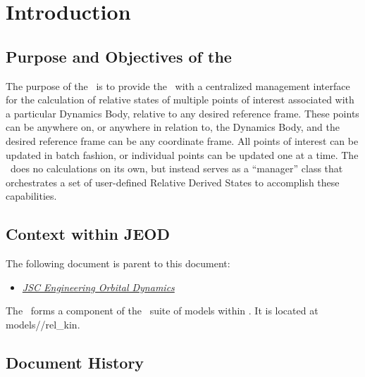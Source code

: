 \setcounter{chapter}{0}

\chapter{Introduction}\label{ch:intro}

\section{Purpose and Objectives of the \relkinDesc}

The purpose of the \relkinDesc\ is to provide the \JEODid\ with a centralized
management interface for the calculation of relative states of multiple points
of interest associated with a particular Dynamics Body, relative to any
desired reference frame.  These points can be anywhere on, or anywhere in
relation to, the Dynamics Body, and the desired reference frame can be any
coordinate frame. All points of interest can be updated in batch fashion, or
individual points can be updated one at a time.  The \relkinDesc\ does no
calculations on its own, but instead serves as a ``manager'' class that
orchestrates a set of user-defined Relative Derived States to accomplish these
capabilities.


\section{Context within JEOD}
The following document is parent to this document:
\begin{itemize}
\item{\href{file:\JEODHOME/docs/JEOD.pdf}
           {\em JSC Engineering Orbital Dynamics}}
                          \cite{dynenv:JEOD}
\end{itemize}

The \relkinDesc\ forms a component of the \ModelClass\ suite of
models within \JEODid. It is located at
models/\ModelClass/rel\_kin.


\section{Document History}

